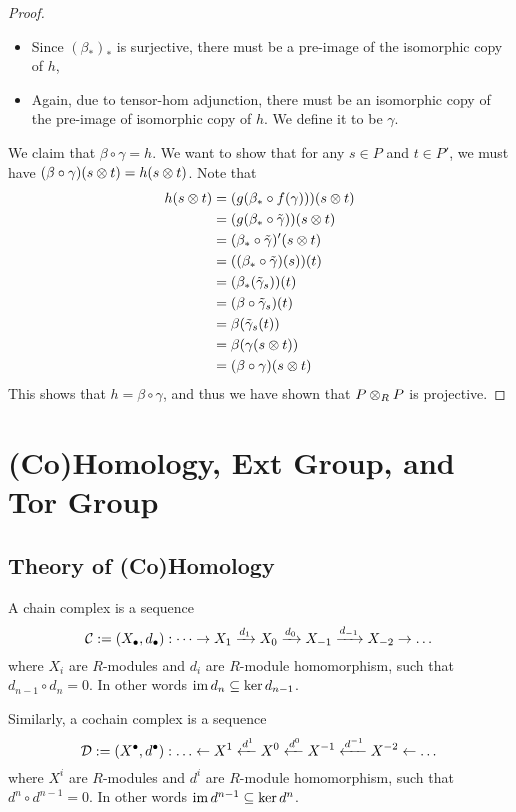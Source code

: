 \begin{proof}
\begin{itemize}
        \item Since $(\beta_*)_*$ is surjective, there must be a pre-image of the isomorphic copy of $h$,
        \item Again, due to tensor-hom adjunction, there must be an isomorphic copy of the pre-image of isomorphic copy of $h$. We define it to be $\gamma$.
    \end{itemize}
    We claim that $\beta\circ \gamma = h$. We want to show that for any $s\in P$ and $t\in P'$, we must have $(\beta\circ\gamma)(s\otimes t) = h(s\otimes t)$. Note that 
    \begin{align*}
        h(s\otimes t)
        &= (g(\beta_* \circ f(\gamma)))(s\otimes t) \\
        &= (g(\beta_* \circ \tilde\gamma))(s\otimes t)\\
        &= (\beta_* \circ \tilde\gamma)'(s\otimes t)\\
        &= ((\beta_* \circ \tilde\gamma)(s)) (t) \\
        &= (\beta_* (\tilde\gamma_s))(t) \\
        &= (\beta\circ \tilde\gamma_s)(t) \\
        &= \beta(\tilde\gamma_s(t)) \\
        &= \beta(\gamma(s\otimes t)) \\
        &= (\beta\circ \gamma)(s\otimes t)
    \end{align*}
    This shows that $h= \beta\circ \gamma$, and thus we have shown that $P\otimes_R P$ is projective.
\end{proof}

\newpage
\section{(Co)Homology, Ext Group, and Tor Group}
\subsection{Theory of (Co)Homology}

\begin{defn}
    A chain complex is a sequence
    \[\mathcal C := (X_{\bullet}, d_\bullet):\dots \to X_1 \xrightarrow{d_1} X_0 \xrightarrow{d_0} X_{-1} \xrightarrow{d_{-1}} X_{-2} \to \dots\]
    where $X_i$ are $R$-modules and $d_i$ are $R$-module homomorphism, such that $d_{n-1}\circ d_n = 0$. In other words $\operatorname{im} d_n \subseteq \ker d_{n-1}$.

    Similarly, a cochain complex is a sequence 
    \[\mathcal D:=(X^{\bullet}, d^\bullet):\dots \ot X^1 \xot {d^1} X^0 \xot{d^0} X^{-1} \xot{d^{-1}} X^{-2} \ot \dots\]
    where $X^i$ are $R$-modules and $d^i$ are $R$-module homomorphism, such that $d^{n}\circ d^{n-1} = 0$. In other words $\operatorname{im} d^{n-1} \subseteq \ker d^{n}$.
\end{defn}

